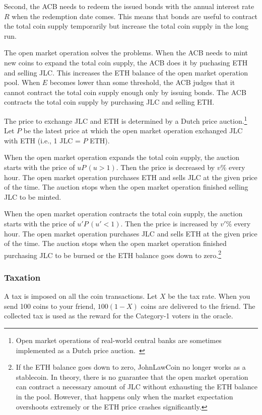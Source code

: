 \documentclass[dvipdfmx,a4paper]{article}
\begin{document}
Second, the ACB needs to redeem the issued bonds with the annual interest rate $R$ when the redemption date comes. This means that bonds are useful to contract the total coin supply temporarily but increase the total coin supply in the long run.

The open market operation solves the problems. When the ACB needs to mint new coins to expand the total coin supply, the ACB does it by puchasing ETH and selling JLC. This increases the ETH balance of the open market operation pool. When $E$ becomes lower than some threshold, the ACB judges that it cannot contract the total coin supply enough only by issuing bonds. The ACB contracts the total coin supply by purchasing JLC and selling ETH.

The price to exchange JLC and ETH is determined by a Dutch price auction.\footnote{Open market operations of real-world central banks are sometimes implemented as a Dutch price auction.~\cite{ayuso2003model}} Let $P$ be the latest price at which the open market operation exchanged JLC with ETH (i.e., 1 JLC = $P$ ETH).

When the open market operation expands the total coin supply, the auction starts with the price of $uP\,(u>1)$. Then the price is decreased by $v$\% every hour. The open market operation purchases ETH and sells JLC at the given price of the time. The auction stops when the open market operation finished selling JLC to be minted.

When the open market operation contracts the total coin supply, the auction starts with the price of $u'P\,(u'<1)$. Then the price is increased by $v'$\% every hour. The open market operation purchases JLC and sells ETH at the given price of the time. The auction stops when the open market operation finished purchasing JLC to be burned or the ETH balance goes down to zero.\footnote{If the ETH balance goes down to zero, JohnLawCoin no longer works as a stablecoin. In theory, there is no guarantee that the open market operation can contract a necessary amount of JLC without exhausting the ETH balance in the pool. However, that happens only when the market expectation overshoots extremely or the ETH price crashes significantly.}

\subsubsection{Taxation}

A tax is imposed on all the coin transactions. Let $X$ be the tax rate. When you send 100 coins to your friend, $100(1-X)$ coins are delivered to the friend. The collected tax is used as the reward for the Category-1 voters in the oracle.
\end{document}
